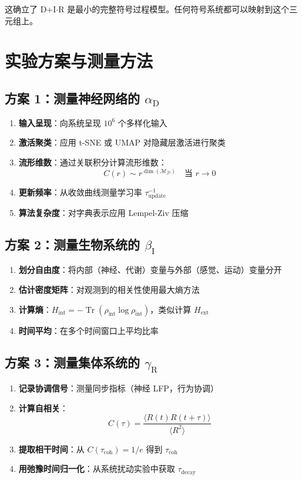 \documentclass[11pt,a4paper]{article}
\DeclareMathOperator{\Tr}{Tr}
\DeclareMathOperator{\dimension}{dim}
\DeclareRobustCommand{\alD}{\texorpdfstring{\ensuremath{\alpha_{\mathrm{D}}}}{alpha_D}}
\DeclareRobustCommand{\beI}{\texorpdfstring{\ensuremath{\beta_{\mathrm{I}}}}{beta_I}}
\DeclareRobustCommand{\gaR}{\texorpdfstring{\ensuremath{\gamma_{\mathrm{R}}}}{gamma_R}}
\newcommand{\Dict}{\mathcal{D}}
\newcommand{\Mdict}{\mathcal{M}_{\Dict}}
\begin{document}
	这确立了 D+I\(\cdot\)R 是最小的完整符号过程模型。任何符号系统都可以映射到这个三元组上。
	
	\section{实验方案与测量方法}
	
	\subsection{方案 1：测量神经网络的 \alD}
	\label{subsec:protocol-alpha}
	
	\begin{enumerate}
		\item \textbf{输入呈现}：向系统呈现 \(10^6\) 个多样化输入
		\item \textbf{激活聚类}：应用 t-SNE 或 UMAP 对隐藏层激活进行聚类
		\item \textbf{流形维数}：通过关联积分计算流形维数：
		\[
		C(r) \sim r^{\dimension(\Mdict)} \quad \text{当 } r \to 0
		\]
		\item \textbf{更新频率}：从收敛曲线测量学习率 \(\tau_{\mathrm{update}}^{-1}\)
		\item \textbf{算法复杂度}：对字典表示应用 Lempel-Ziv 压缩
	\end{enumerate}
	
	\subsection{方案 2：测量生物系统的 \beI}
	
	\begin{enumerate}
		\item \textbf{划分自由度}：将内部（神经、代谢）变量与外部（感觉、运动）变量分开
		\item \textbf{估计密度矩阵}：对观测到的相关性使用最大熵方法
		\item \textbf{计算熵}：\(H_{\mathrm{int}} = -\Tr(\rho_{\mathrm{int}}\log\rho_{\mathrm{int}})\)，类似计算 \(H_{\mathrm{ext}}\)
		\item \textbf{时间平均}：在多个时间窗口上平均比率
	\end{enumerate}
	
	\subsection{方案 3：测量集体系统的 \gaR}
	
	\begin{enumerate}
		\item \textbf{记录协调信号}：测量同步指标（神经 LFP，行为协调）
		\item \textbf{计算自相关}：
		\[
		C(\tau) = \frac{\langle R(t)R(t+\tau)\rangle}{\langle R^2\rangle}
		\]
		\item \textbf{提取相干时间}：从 \(C(\tau_{\mathrm{coh}}) = 1/e\) 得到 \(\tau_{\mathrm{coh}}\)
		\item \textbf{用弛豫时间归一化}：从系统扰动实验中获取 \(\tau_{\mathrm{decay}}\)
	\end{enumerate}
	
\end{document}
